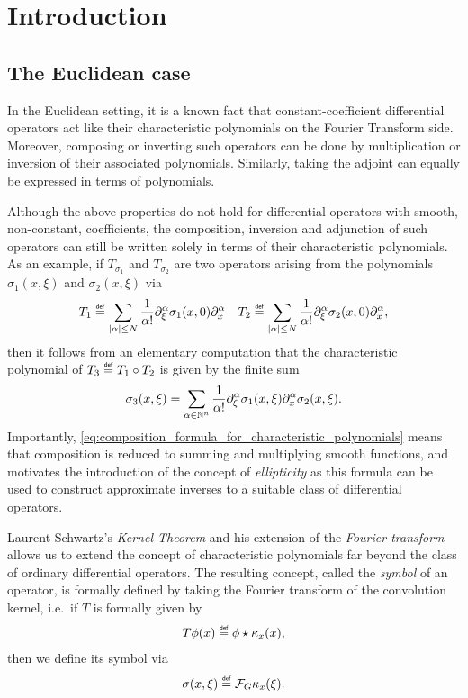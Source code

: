 \chapter{Introduction}

\section{The Euclidean case}

In the Euclidean setting,
it is a known fact that constant-coefficient differential operators act like their characteristic polynomials on the Fourier Transform side.
Moreover, composing or inverting such operators can be done by multiplication or inversion of their associated polynomials.
Similarly, taking the adjoint can equally be expressed in terms of polynomials.

Although the above properties do not hold for differential operators with smooth, non-constant, coefficients,
the composition, inversion and adjunction of such operators can still be written solely in terms of their characteristic polynomials.
As an example,
if $T_{\sigma_1}$ and $T_{\sigma_2}$ are two operators arising from the polynomials $\sigma_1(x, \xi)$ and $\sigma_2(x, \xi)$ via
\begin{align*}
    T_1 \defeq \sum_{\abs \alpha \leq N} \frac 1 {\alpha!} \iD{\xi^\alpha} \sigma_1(x, 0) \iD{x^\alpha}
    \quad
    T_2 \defeq \sum_{\abs \alpha \leq N} \frac 1 {\alpha!} \iD{\xi^\alpha} \sigma_2(x, 0) \iD{x^\alpha},
\end{align*}
then it follows from an elementary computation
that the characteristic polynomial of $T_3 \defeq T_1 \circ T_2$ is given by the finite sum
\begin{align}
    \sigma_3(x, \xi) = \sum_{\alpha \in \N^n} \frac 1 {\alpha!} \iD{\xi^\alpha} \sigma_1(x, \xi) \iD{x^\alpha} \sigma_2(x, \xi)
    \label{eq:composition_formula_for_characteristic_polynomials}.
\end{align}
Importantly,
\eqref{eq:composition_formula_for_characteristic_polynomials} means that
composition is reduced to summing and multiplying smooth functions,
and motivates the introduction of the concept of \emph{ellipticity}
as this formula can be used to construct approximate inverses to a suitable class of differential operators.

Laurent Schwartz's \emph{Kernel Theorem} and his extension of the \emph{Fourier transform} allows us to extend the concept of characteristic polynomials far beyond the class of ordinary differential operators.
The resulting concept, called the \emph{symbol} of an operator,
is formally defined by taking the Fourier transform of the convolution kernel,
i.e.\ if $T$ is formally given by
\begin{align*}
    T \phi(x) \defeq \conv \phi {\kappa_x}(x),
\end{align*}
then we define its symbol via
\begin{align*}
    \sigma(x, \xi) \defeq \Fourier \kappa_x(\xi).
\end{align*}

